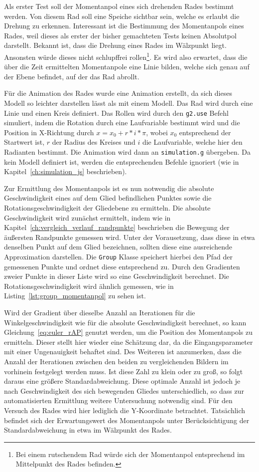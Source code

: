 Als erster Test soll der Momentanpol eines sich drehenden Rades bestimmt werden.
Von diesem Rad soll eine Speiche sichtbar sein, welche es erlaubt die Drehung zu erkennen.
Interessant ist die Bestimmung des Momentanpols eines Rades, weil dieses als erster der bisher gemachteten Tests keinen Absolutpol darstellt.
Bekannt ist, dass die Drehung eines Rades im Wälzpunkt liegt.
Ansonsten würde dieses nicht schlupffrei rollen\footnote{Bei einem rutschendem Rad würde sich der Momentanpol entsprechend im Mittelpunkt des Rades befinden.}.
Es wird also erwartet, dass die über die Zeit ermittelten Momentanpole eine Linie bilden, welche sich genau auf der Ebene befindet, auf der das Rad abrollt.

Für die Animation des Rades wurde eine  Animation erstellt,
da sich dieses Modell so leichter darstellen lässt als mit einem  Modell.
Das Rad wird durch eine Linie und einen Kreis definiert.
Das Rollen wird durch den \lstinline{g2.use} Befehl simuliert, indem die Rotation durch eine Laufvariable bestimmt wird und die Position in X-Richtung durch $x = x_0 + r * i * \pi$, wobei $x_0$ entsprechend der Startwert ist, $r$ der Radius des Kreises und $i$ die Laufvariable, welche hier den Radianten bestimmt.
Die Animation wird dann an \lstinline{simulation.g} übergeben.
Da kein  Modell definiert ist, werden die entsprechenden Befehle ignoriert (wie in Kapitel~\ref{ch:simulation_js} beschrieben).

Zur Ermittlung des Momentanpols ist es nun notwendig die absolute Geschwindigkeit eines auf dem Glied befindlichen Punktes sowie die Rotationsgeschwindigkeit der Gliedebene zu ermitteln.
Die absolute Geschwindigkeit wird zunächst ermittelt, indem wie in Kapitel~\ref{ch:vergleich_verlauf_randpunkte} beschrieben die Bewegung der äu{\ss}ersten Randpunkte gemessen wird.
Unter der Vorausetzung, dass diese in etwa denselben Punkt auf dem Glied bezeichnen, sollten diese eine ausreichende Approximation darstellen.
Die \lstinline{Group} Klasse speichert hierbei den Pfad der gemessenen Punkte und ordnet diese entsprechend zu.
Durch den Gradienten zweier Punkte in dieser Liste wird so eine Geschwindigkeit berechnet.
Die Rotationsgeschwindigkeit wird ähnlich gemessen, wie in Listing~\ref{lst:group_momentanpol} zu sehen ist.

Wird der Gradient über dieselbe Anzahl an Iterationen für die Winkelgeschwindigkeit wie für die absolute Geschwindigkeit berechnet, so kann Gleichung~\ref{eq:euler_rAP} genutzt werden, um die Position des Momentanpols zu ermitteln.
Dieser stellt hier wieder eine Schätzung dar, da die Eingangsparameter mit einer Ungenauigkeit behaftet sind.
Des Weiteren ist anzumerken, dass die Anzahl der Iterationen zwischen den beiden zu vergleichenden Bildern im vorhinein festgelegt werden muss.
Ist diese Zahl zu klein oder zu gro{\ss}, so folgt daraus eine grö{\ss}ere Standardabweichung.
Diese optimale Anzahl ist jedoch je nach Geschwindigkeit des sich bewegenden Gliedes unterschiedlich, so dass zur automatisierten Ermittlung weitere Untersuchung notwendig sind.
Für den Versuch des Rades wird hier lediglich die Y-Koordinate betrachtet.
Tatsächlich befindet sich der Erwartungswert des Momentanpols unter Berücksichtigung der Standardabweichung in etwa im Wälzpunkt des Rades.

